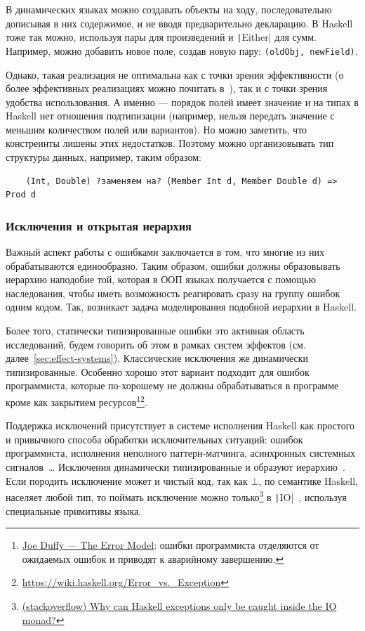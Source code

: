 В динамических языках можно создавать объекты на ходу, последовательно дописывая в них содержимое, и не вводя предварительно декларацию.
В Haskell тоже так можно, используя пары для произведений и \texttt|Either| для сумм.
Например, можно добавить новое поле, создав новую пару: \texttt{(oldObj, newField)}.

Однако, такая реализация не оптимальна как с точки зрения эффективности (о более эффективных реализациях можно почитать в~\cite[глава 11]{maguire-types}), так и с точки зрения удобства использования.
А именно --- порядок полей имеет значение и на типах в Haskell нет отношения подтипизации (например, нельзя передать значение с меньшим количеством полей или вариантов).
Но можно заметить, что констреинты лишены этих недостатков.
Поэтому можно организовывать тип структуры данных, например, таким образом:
\begin{verbatim}
    (Int, Double) ?заменяем на? (Member Int d, Member Double d) => Prod d
\end{verbatim}

\subsubsection{Исключения и открытая иерархия}

Важный аспект работы с ошибками заключается в том, что многие из них обрабатываются единообразно.
Таким образом, ошибки должны образовывать иерархию наподобие той, которая в ООП языках получается с помощью наследования, чтобы иметь возможность реагировать сразу на группу ошибок одним кодом.
Так, возникает задача моделирования подобной иерархии в Haskell.

Более того, статически типизированные ошибки это активная область исследований, будем говорить об этом в рамках систем эффектов (см. далее~\ref{sec:effect-systems}).
Классические исключения же динамически типизированные.
Особенно хорошо этот вариант подходит для ошибок программиста, которые по-хорошему не должны обрабатываться в программе кроме как закрытием ресурсов\footnote{\href{https://joeduffyblog.com/2016/02/07/the-error-model/}{Joe Duffy --- The Error Model}: ошибки программиста отделяются от ожидаемых ошибок и приводят к аварийному завершению.}\footnote{\url{https://wiki.haskell.org/Error_vs._Exception}}.

Поддержка исключений присутствует в системе исполнения Haskell как простого и привычного способа обработки исключительных ситуаций: ошибок программиста, исполнения неполного паттерн-матчинга, асинхронных системных сигналов~\cite{marlow2001asynchronous}\ldots
Исключения динамически типизированные и образуют иерархию~\cite{marlow2006extensible}.
Если породить исключение может и чистый код, так как $\bot$, по семантике Haskell, населяет любой тип, то поймать исключение можно только\footnote{\href{https://stackoverflow.com/questions/3642793/why-can-haskell-exceptions-only-be-caught-inside-the-io-monad}{(stackoverflow) Why can Haskell exceptions only be caught inside the IO monad?}} в \texttt|IO|~\cite{jones2001tackling}, используя специальные примитивы языка.

